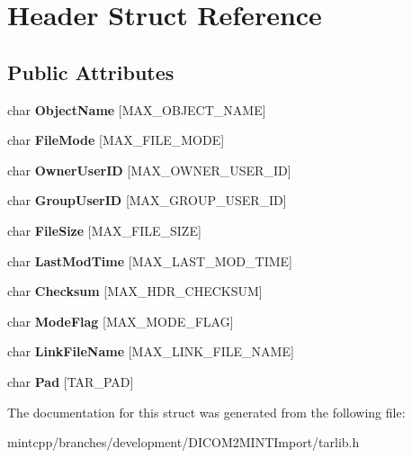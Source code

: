 \hypertarget{struct_header}{
\section{Header Struct Reference}
\label{struct_header}
}
\subsection*{Public Attributes}
\begin{DoxyCompactItemize}
\item 
\hypertarget{struct_header_a2d25a2772ab01649b944d60e777faceb}{
char {\bfseries ObjectName} \mbox{[}MAX\_\-OBJECT\_\-NAME\mbox{]}}
\label{struct_header_a2d25a2772ab01649b944d60e777faceb}

\item 
\hypertarget{struct_header_a169bf1c2fd88701ea6340197ae6565b6}{
char {\bfseries FileMode} \mbox{[}MAX\_\-FILE\_\-MODE\mbox{]}}
\label{struct_header_a169bf1c2fd88701ea6340197ae6565b6}

\item 
\hypertarget{struct_header_a9cb35b02963e140b4f28ebdfae667ea0}{
char {\bfseries OwnerUserID} \mbox{[}MAX\_\-OWNER\_\-USER\_\-ID\mbox{]}}
\label{struct_header_a9cb35b02963e140b4f28ebdfae667ea0}

\item 
\hypertarget{struct_header_ad0187ff7bb145c2e53c99f4edb274bde}{
char {\bfseries GroupUserID} \mbox{[}MAX\_\-GROUP\_\-USER\_\-ID\mbox{]}}
\label{struct_header_ad0187ff7bb145c2e53c99f4edb274bde}

\item 
\hypertarget{struct_header_a7e2fe459dc8d1b5d29d2d047b9e1bf0c}{
char {\bfseries FileSize} \mbox{[}MAX\_\-FILE\_\-SIZE\mbox{]}}
\label{struct_header_a7e2fe459dc8d1b5d29d2d047b9e1bf0c}

\item 
\hypertarget{struct_header_a6e30a7fec4279e7bf0280f71b9ae69b2}{
char {\bfseries LastModTime} \mbox{[}MAX\_\-LAST\_\-MOD\_\-TIME\mbox{]}}
\label{struct_header_a6e30a7fec4279e7bf0280f71b9ae69b2}

\item 
\hypertarget{struct_header_aa654d1c0a3e0df8f7bc33f06569f6694}{
char {\bfseries Checksum} \mbox{[}MAX\_\-HDR\_\-CHECKSUM\mbox{]}}
\label{struct_header_aa654d1c0a3e0df8f7bc33f06569f6694}

\item 
\hypertarget{struct_header_a82df8c0c6a1b20024339f9debdea5308}{
char {\bfseries ModeFlag} \mbox{[}MAX\_\-MODE\_\-FLAG\mbox{]}}
\label{struct_header_a82df8c0c6a1b20024339f9debdea5308}

\item 
\hypertarget{struct_header_ab7b887bc53677bd9897253e0c680c9ba}{
char {\bfseries LinkFileName} \mbox{[}MAX\_\-LINK\_\-FILE\_\-NAME\mbox{]}}
\label{struct_header_ab7b887bc53677bd9897253e0c680c9ba}

\item 
\hypertarget{struct_header_ab3443eba94e973b71db3f622a979b313}{
char {\bfseries Pad} \mbox{[}TAR\_\-PAD\mbox{]}}
\label{struct_header_ab3443eba94e973b71db3f622a979b313}

\end{DoxyCompactItemize}


The documentation for this struct was generated from the following file:\begin{DoxyCompactItemize}
\item 
mintcpp/branches/development/DICOM2MINTImport/tarlib.h\end{DoxyCompactItemize}
